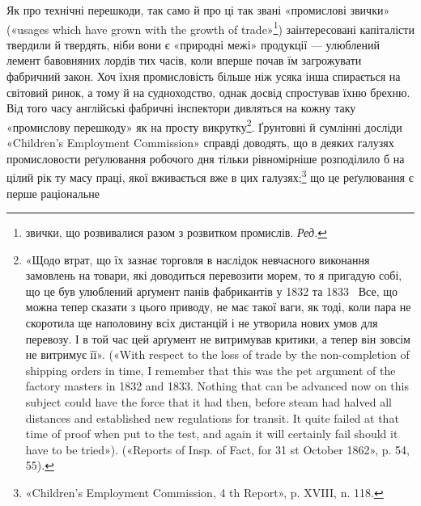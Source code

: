 Як про технічні перешкоди, так само й про ці так звані «промислові звички» («usages which have grown
with the growth of
trade»\footnote*{
звички, що розвивалися разом з розвитком промислів. \emph{Ред.}
}) заінтересовані капіталісти твердили й твердять, ніби
вони є «природні межі» продукції — улюблений лемент бавовняних лордів тих часів, коли вперше почав
їм загрожувати фабричний закон. Хоч їхня промисловість більше ніж усяка інша
спирається на світовий ринок, а тому й на судноходство, однак
досвід спростував їхню брехню. Від того часу англійські фабричні
інспектори дивляться на кожну таку «промислову перешкоду»
як на просту викрутку\footnote{
«Щодо втрат, що їх зазнає торговля в наслідок невчасного виконання замовлень на товари, які
доводиться перевозити морем, то я пригадую
собі, що це був улюблений арґумент панів фабрикантів у 1832 та 1833~
Все, що можна тепер сказати з цього приводу, не має такої ваги, як тоді,
коли пара не скоротила ще наполовину всіх дистанцій і не утворила нових
умов для перевозу. І в той час цей арґумент не витримував критики, а
тепер він зовсім не витримує її». («With respect to the loss of trade by
the non-completion of shipping orders in time, I remember that this was
the pet argument of the factory masters in 1832 and 1833. Nothing that
can be advanced now on this subject could have the force that it had then,
before steam had halved all distances and established new regulations
for transit. It quite failed at that time of proof when put to the test, and
again it will certainly fail should it have to be tried»). («Reports of Insp.
of Fact, for 31 st October 1862», p. 54, 55).
}. Ґрунтовні й сумлінні досліди «Children’s
Employment Commission» справді доводять, що в деяких
галузях промисловости реґулювання робочого дня тільки рівномірніше розподілило б на цілий рік ту
масу праці, якої вживається вже в цих галузях;\footnote{
«Children’s Employment Commission, 4 th Report», p. XVIII,
n. 118.
} що це реґулювання є перше раціональне
